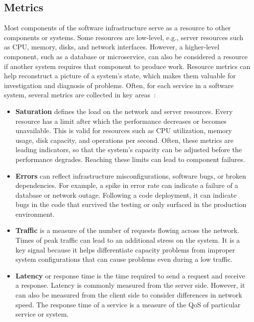 \subsection{Metrics}\label{ch:background:sec:observability:subsec:metrics}
Most components of the software infrastructure serve as a resource to other components or systems. Some resources are low-level, e.g., server resources such as CPU, memory, disks, and network interfaces. However, a higher-level component, such as a database or microservice, can also be considered a resource if another system requires that component to produce work. Resource metrics can help reconstruct a picture of a system's state, which makes them valuable for investigation and diagnosis of problems. Often, for each service in a software system, several metrics are collected in key areas~\cite{chen2019anomaly}:
\begin{itemize}
    \item \textbf{Saturation} defines the load on the network and server resources. Every resource has a limit after which the performance decreases or becomes unavailable. This is valid for resources such as CPU utilization, memory usage, disk capacity, and operations per second. Often, these metrics are leading indicators, so that the system's capacity can be adjusted before the performance degrades. Reaching these limits can lead to component failures.
    \item \textbf{Errors} can reflect infrastructure misconfigurations, software bugs, or broken dependencies. For example, a spike in error rate can indicate a failure of a database or network outage. Following a code deployment, it can indicate bugs in the code that survived the testing or only surfaced in the production environment. 
    \item \textbf{Traffic} is a measure of the number of requests flowing across the network. Times of peak traffic can lead to an additional stress on the system. It is a key signal because it helps differentiate capacity problems from improper system configurations that can cause problems even during a low traffic.
    \item \textbf{Latency} or response time is the time required to send a request and receive a response. Latency is commonly measured from the server side. However, it can also be measured from the client side to consider differences in network speed. The response time of a service is a measure of the QoS of particular service or system. 
\end{itemize}


